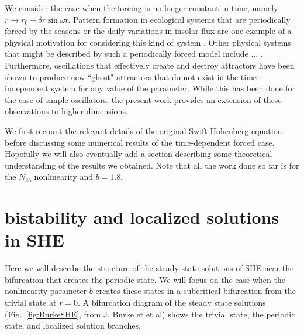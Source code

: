 \documentclass[pre,preprint,superscriptaddress]{revtex4-1}
\begin{document}
We consider the case when the forcing is no longer constant in time, namely $r\rightarrow r_0+\delta r \sin\omega t$.  Pattern formation in ecological systems that are periodically forced by the seasons or the daily variations in insolar flux are one example of a physical motivation for considering this kind of system \cite{}.  Other physical systems that might be described by such a periodically forced model include ... \cite{}.   Furthermore, oscillations that effectively create and destroy attractors have been shown to produce new ``ghost" attractors that do not exist in the time-independent system for any value of the parameter\cite{}.  While this has been done for the case of simple oscillators, the present work provides an extension of these observations to higher dimensions.

We first recount the relevant details of the original Swift-Hohenberg equation before discussing some numerical results of the time-dependent forced case.  Hopefully we will also eventually add a section describing some theoretical understanding of the results we obtained.  Note that all the work done so far is for the $N_{23}$ nonlinearity and $b=1.8$.


\section{bistability and localized solutions in SHE}
Here we will describe the structure of the steady-state solutions of SHE near the bifurcation that creates the periodic state.  We will focus on the case when the nonlinearity parameter $b$ creates these states in a subcritical bifurcation from the trivial state at $r=0$.  A bifurcation diagram of the steady state solutions (Fig.~\ref{fig:BurkeSHE}, from J. Burke et et al) shows the trivial state, the periodic state, and localized solution branches.  
\end{document}
